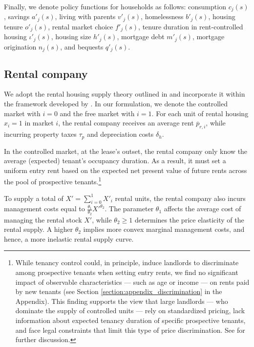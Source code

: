 \documentclass[parskip=full]{article}
\begin{document}
Finally, we denote policy functions for households as follows: consumption $c_{j}(s)$, savings $a'_{j}(s)$, living with parents $v'_{j}(s)$, homelessness $b'_{j}(s)$, housing tenure $o'_{j}(s)$, rental market choice $f'_{j}(s)$, tenure duration in rent-controlled housing $\iota'_{j}(s)$, housing size $h'_{j}(s)$, mortgage debt $m'_{j}(s)$, mortgage origination $n_{j}(s)$, and bequests $q'_{j}(s)$.

\subsection{Rental company}\label{sec:rental_company}

We adopt the rental housing supply theory outlined in \citet{fallis-1985} and incorporate it within the framework developed by \citet{garrigaeetal-2009}. In our formulation, we denote the controlled market with $i=0$ and the free market with $i=1$. For each unit of rental housing $x_i = 1$ in market $i$, the rental company receives an average rent $\overline{p}_{r,i}$, while incurring property taxes $\tau_{p}$ and depreciation costs $\delta_{h}$. 

In the controlled market, at the lease's outset, the rental company only know the average (expected) tenant's occupancy duration. As a result, it must set a uniform entry rent based on the expected net present value of future rents across the pool of prospective tenants.\footnote{While tenancy control could, in principle, induce landlords to discriminate among prospective tenants when setting entry rents, we find no significant impact of observable characteristics — such as age or income — on rents paid by new tenants (see Section \ref{section:appendix_discrimination} in the Appendix). This finding supports the view that large landlords — who dominate the supply of controlled units — rely on standardized pricing, lack information about expected tenancy duration of specific prospective tenants, and face legal constraints that limit this type of price discrimination. See \citet{be-2000} for further discussion.}

To supply a total of $X'=\sum^{1}_{i=0} X'_{i}$ rental units, the rental company also incurs management costs equal to $\frac{\theta_{1}}{\theta_{2}}X'^{\theta_{2}}$. The parameter $\theta_{1}$ affects the average cost of managing the rental stock $X'$, while $\theta_{2}\geq 1$ determines the price elasticity of the rental supply. A higher $\theta_{2}$ implies more convex marginal management costs, and hence, a more inelastic rental supply curve.
\end{document}
